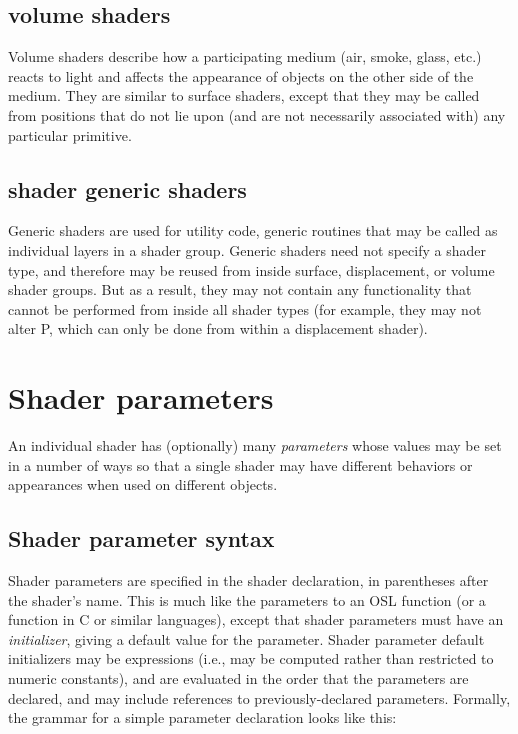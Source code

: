 \documentclass[11pt,letterpaper]{book}
\def\P{{\cf P}\xspace}
\begin{document}
\subsection*{{\cf volume} shaders}

Volume shaders describe how a participating medium (air, smoke, glass,
etc.) reacts to light and affects the appearance of objects on the other
side of the medium.  They are similar to {\cf surface} shaders, except
that they may be called from positions that do not lie upon (and are not
necessarily associated with) any particular primitive.



\subsection*{{\cf shader} generic shaders}

Generic shaders are used for utility code, generic routines that may be
called as individual layers in a shader group.  Generic shaders need not
specify a shader type, and therefore may be reused from inside surface,
displacement, or volume shader groups.  But as a result, they may
not contain any functionality that cannot be performed from inside all
shader types (for example, they may not alter \P, which can only be done
from within a displacement shader).


\section{Shader parameters}
\label{sec:shaderparams}
 

An individual shader has (optionally) many \emph{parameters} whose
values may be set in a number of ways so that a single shader may have
different behaviors or appearances when used on different objects.

\subsection{Shader parameter syntax}

Shader parameters are specified in the shader declaration, in
parentheses after the shader's name.  This is much like the parameters
to an OSL function (or a function in C or similar languages),
except that shader parameters must have an \emph{initializer}, giving a
default value for the parameter.  Shader parameter default initializers
may be expressions (i.e., may be computed rather than restricted to
numeric constants), and are evaluated in the order that the parameters
are declared, and may include references to previously-declared
parameters.  Formally, the grammar for a simple parameter
declaration looks like this:
\end{document}
